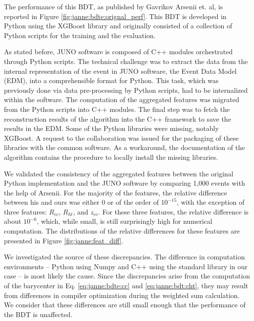\documentclass[../main.tex]{subfiles}
\begin{document}
The performance of this BDT, as published by Gavrikov Arsenii et. al, is reported in Figure \ref{fig:janne:bdte:orignal_perf}. This BDT is developed in Python using the XGBoost \cite{chen_xgboost_2016} library and originally consisted of a collection of Python scripts for the training and the evaluation.

As stated before, JUNO software is composed of C++ modules orchestrated through Python scripts. The technical challenge was to extract the data from the internal representation of the event in JUNO software, the Event Data Model (EDM), into a comprehensible format for Python. This task, which was previously done via data pre-processing by Python scripts, had to be internalized within the software. The computation of the aggregated features was migrated from the Python scripts into C++ modules. The final step was to fetch the reconstruction results of the algorithm into the C++ framework to save the results in the EDM. Some of the Python libraries were missing, notably XGBoost. A request to the collaboration was issued for the packaging of these libraries with the common software. As a workaround, the documentation of the algorithm contains the procedure to locally install the missing libraries.

We validated the consistency of the aggregated features between the original Python implementation and the JUNO software by comparing 1,000 events with the help of Arsenii. For the majority of the features, the relative difference between his and ours was either 0 or of the order of $10^{-15}$, with the exception of three features: $R_{cc}$, $R_{ht}$, and $z_{cc}$. For these three features, the relative difference is about $10^{-6}$, which, while small, is still surprisingly high for numerical computation. The distributions of the relative differences for these features are presented in Figure \ref{fig:janne:feat_diff}.

We investigated the source of these discrepancies. The difference in computation environments -- Python using Numpy \cite{harris_array_2020} and C++ using the standard library in our case -- is most likely the cause. Since the discrepancies arise from the computation of the barycenter in Eq. \ref{eq:janne:bdte:cc} and \ref{eq:janne:bdt:cht}, they may result from differences in compiler optimization during the weighted sum calculation. We consider that these differences are still small enough that the performance of the BDT is unaffected.
\end{document}
